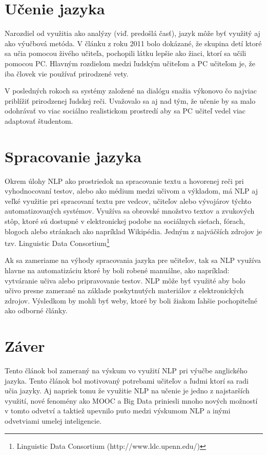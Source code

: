 \documentclass[10pt,slovak,a4paper,twoside]{article}
\begin{document}
\section{Učenie jazyka} \label{ucenie_pomocou_nlp}
	Narozdiel od využitia ako analýzy (viď. predošlá časť), jazyk môže byť využitý aj ako výučbová metóda.
	V článku z roku 2011\cite{clanok_o_studovani} bolo dokázané, že skupina detí ktoré sa učia pomocou živého učiteľa, 
	pochopili látku lepšie ako žiaci, ktorí sa učili pomocou PC. Hlavným rozdielom medzi ľudským učiteľom a PC učiteľom 
	je, že iba človek vie používať prirodzené vety.

	V posledných rokoch sa systémy založené na dialógu snažia výkonovo čo najviac
	priblížiť prirodzenej ľudskej reči. Uvažovalo sa aj nad tým, že učenie by sa malo odohrávať vo viac sociálno realistickom prostredí aby sa PC učiteľ vedel viac adaptovať študentom.
\section{Spracovanie jazyka} \label{spracovanie_jazyka}
	Okrem úlohy NLP ako prostriedok na spracovanie textu a hovorenej reči pri vyhodnocovaní testov, 
	alebo ako médium medzi učivom a výkladom, má NLP aj veľké využitie pri spracovaní textu pre vedcov, 
	učiteľov alebo vývojárov týchto automatizovaných systémov. Využíva sa obrovské množstvo textov a zvukových
	stôp, ktoré sú dostupné v elektronickej podobe na sociálnych sieťach, fórach, blogoch alebo stránkach ako 
	napríklad Wikipédia. Jedným z najväčších zdrojov je tzv. Linguistic Data Consortium\footnote{Linguistic Data Consortium (http://www.ldc.upenn.edu/)}
	
	Ak sa zameriame na výhody spracovania jazyka pre učiteľov, tak sa NLP využíva hlavne na automatizáciu ktoré by boli robené manuálne, 
	ako napríklad: vytváranie učiva alebo pripravovanie testov. NLP môže byť využité aby bolo učivo presne zamerané na základe 
	poskytnutých materiálov z elektronických zdrojov. Výsledkom by mohli byť weby, ktoré by boli žiakom ľahšie pochopiteľné ako odborné články\cite{miltsakaki2009matching}.

\section{Záver} \label{zaver} %
	Tento článok bol zameraný na výskum vo využití NLP pri výučbe anglického jazyka. Tento článok bol motivovaný 
	potrebami učiteľov a ľudmi ktorí sa radi učia jazyky. Aj napriek tomu že využitie NLP na učenie je jedno z najstarších využití, 
	nové fenomény ako MOOC a Big Data priniesli mnoho nových možností v tomto odvetví a taktiež upevnilo puto medzi výskumom NLP a inými 
	odvetviami umelej inteligencie.
\end{document}
